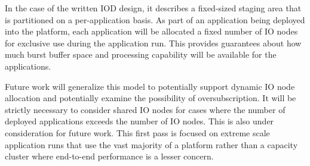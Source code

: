 \documentclass[conference]{IEEEtran}
\begin{document}
%

In the case of the written IOD design, it describes a fixed-sized staging area
that is partitioned on a per-application basis. As part of an application
being deployed into the platform, each application will be allocated a fixed
number of IO nodes for exclusive use during the application run. This provides
guarantees about how much burst buffer space and processing capability will be
available for the applications.


Future work will generalize this model to potentially support dynamic IO node
allocation and potentially examine the possibility of oversubscription. It will
be strictly necessary to consider shared IO nodes for cases where the number
of deployed applications exceeds the number of IO nodes. This is also under
consideration for future work. This first pass is focused on extreme scale
application runs that use the vast majority of a platform rather than a
capacity cluster where end-to-end performance is a lesser concern.
\end{document}
